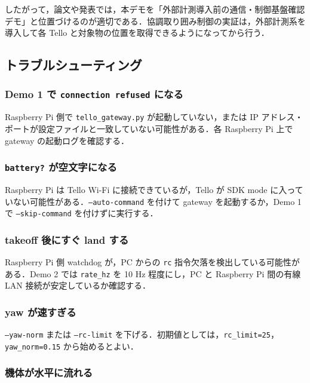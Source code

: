 したがって，論文や発表では，本デモを「外部計測導入前の通信・制御基盤確認デモ」と位置づけるのが適切である．協調取り囲み制御の実証は，外部計測系を導入して各 Tello と対象物の位置を取得できるようになってから行う．

\subsection{トラブルシューティング}

\subsubsection{Demo 1 で \texttt{connection refused} になる}

Raspberry Pi 側で \texttt{tello\_gateway.py} が起動していない，または IP アドレス・ポートが設定ファイルと一致していない可能性がある．各 Raspberry Pi 上で gateway の起動ログを確認する．

\subsubsection{\texttt{battery?} が空文字になる}

Raspberry Pi は Tello Wi-Fi に接続できているが，Tello が SDK mode に入っていない可能性がある．\texttt{--auto-command} を付けて gateway を起動するか，Demo 1 で \texttt{--skip-command} を付けずに実行する．

\subsubsection{takeoff 後にすぐ land する}

Raspberry Pi 側 watchdog が，PC からの \texttt{rc} 指令欠落を検出している可能性がある．Demo 2 では \texttt{rate\_hz} を 10 Hz 程度にし，PC と Raspberry Pi 間の有線 LAN 接続が安定しているか確認する．

\subsubsection{yaw が速すぎる}

\texttt{--yaw-norm} または \texttt{--rc-limit} を下げる．初期値としては，\texttt{rc\_limit=25}，\texttt{yaw\_norm=0.15} から始めるとよい．

\subsubsection{機体が水平に流れる}

